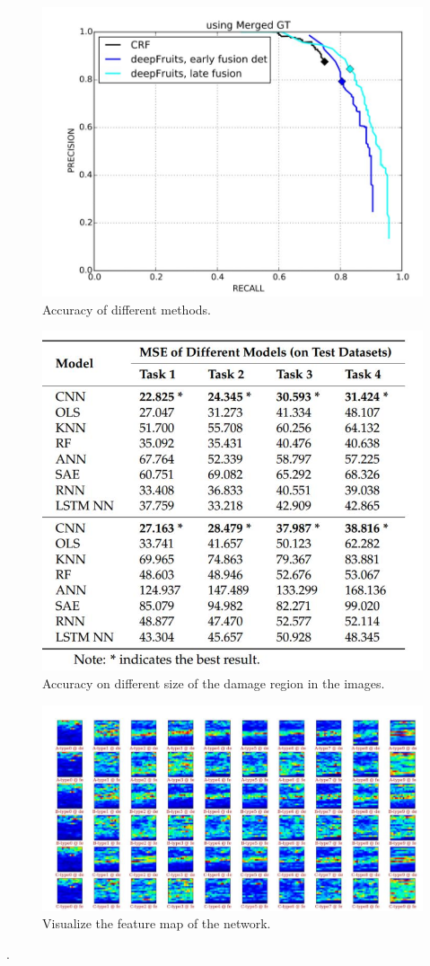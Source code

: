 \documentclass[sensors,article,submit,moreauthors,pdftex,10pt,a4paper]{mdpi}
\begin{document}
\begin{figure}[H]
	\centering
	\includegraphics[width=12 cm]{4.jpg}
	\caption{Accuracy of different methods.}
	\label{Scene-ComparedNet}
\end{figure}

\begin{figure}[H]
	\centering
	\includegraphics[width=10 cm]{5.jpg}
	\caption{Accuracy on different size of the damage region in the images.}
	\label{Scene-ComparedNet}
\end{figure}

\begin{figure}[H]
	\centering
	\includegraphics[width=12 cm]{6.jpg}
	\caption{Visualize the feature map of the network.}
	\label{Scene-ComparedNet}
\end{figure}
.
\end{document}
